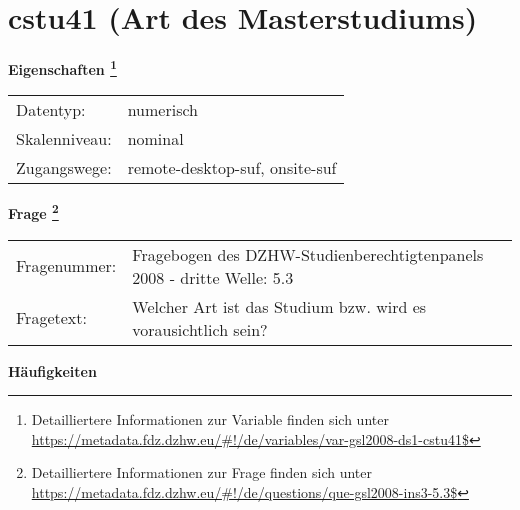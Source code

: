 
    \setcounter{footnote}{0}

    \vspace*{-1.8cm}
	\section{cstu41 (Art des Masterstudiums)}
	\label{section:cstu41}



    \vspace*{0.5cm}
    \noindent\textbf{Eigenschaften
	\footnote{Detailliertere Informationen zur Variable finden sich unter
		\url{https://metadata.fdz.dzhw.eu/\#!/de/variables/var-gsl2008-ds1-cstu41$}}}\\
	\begin{tabularx}{\hsize}{@{}lX}
	Datentyp: & numerisch \\
	Skalenniveau: & nominal \\
	Zugangswege: &
	  remote-desktop-suf, 
	  onsite-suf
 \\
    \end{tabularx}



				\vspace*{0.5cm}
                \noindent\textbf{Frage
	                \footnote{Detailliertere Informationen zur Frage finden sich unter
		              \url{https://metadata.fdz.dzhw.eu/\#!/de/questions/que-gsl2008-ins3-5.3$}}}\\
				\begin{tabularx}{\hsize}{@{}lX}
					Fragenummer: &
					  Fragebogen des DZHW-Studienberechtigtenpanels 2008 - dritte Welle:
					  5.3
 \\
					Fragetext: & Welcher Art ist das Studium bzw. wird es vorausichtlich sein? \\
				\end{tabularx}





        		\vspace*{0.5cm}
                \noindent\textbf{Häufigkeiten}

